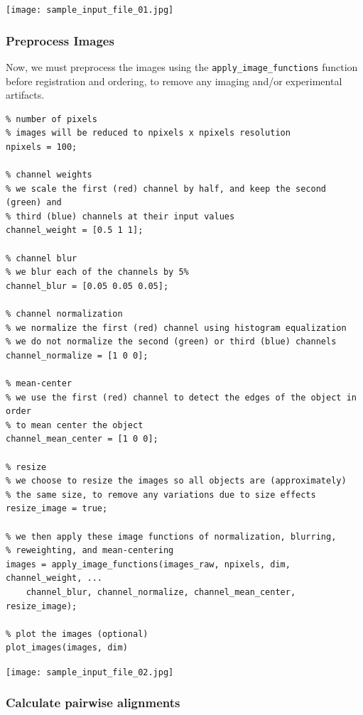 \documentclass[12pt]{article}
\begin{document}
\texttt{[image: sample\_input\_file\_01.jpg]}


\subsubsection{Preprocess Images}

\begin{par}
Now, we must preprocess the images using the \texttt{apply\_image\_functions} function before registration and ordering, to remove any imaging and/or experimental artifacts.
\end{par} \vspace{1em}
\begin{verbatim}
% number of pixels
% images will be reduced to npixels x npixels resolution
npixels = 100;

% channel weights
% we scale the first (red) channel by half, and keep the second (green) and
% third (blue) channels at their input values
channel_weight = [0.5 1 1];

% channel blur
% we blur each of the channels by 5%
channel_blur = [0.05 0.05 0.05];

% channel normalization
% we normalize the first (red) channel using histogram equalization
% we do not normalize the second (green) or third (blue) channels
channel_normalize = [1 0 0];

% mean-center
% we use the first (red) channel to detect the edges of the object in order
% to mean center the object
channel_mean_center = [1 0 0];

% resize
% we choose to resize the images so all objects are (approximately)
% the same size, to remove any variations due to size effects
resize_image = true;

% we then apply these image functions of normalization, blurring,
% reweighting, and mean-centering
images = apply_image_functions(images_raw, npixels, dim, channel_weight, ...
    channel_blur, channel_normalize, channel_mean_center, resize_image);

% plot the images (optional)
plot_images(images, dim)
\end{verbatim}

\texttt{[image: sample\_input\_file\_02.jpg]}


\subsubsection{Calculate pairwise alignments}
\end{document}
